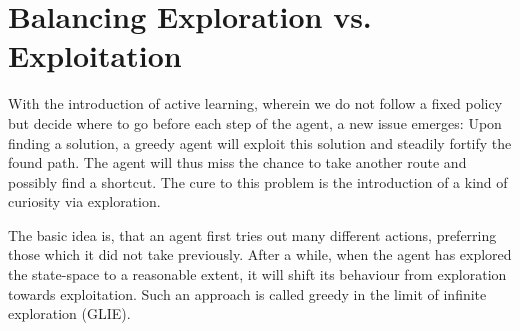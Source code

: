 \documentclass{llncs}
\begin{document}

\section{Balancing Exploration vs. Exploitation}
\label{chap:Balancing}
With the introduction of active learning, wherein we do not follow a fixed policy but decide where to go before each step of the agent, a new issue emerges: Upon finding a solution, a greedy agent will exploit this solution and steadily fortify the found path. The agent will thus miss the chance to take another route and possibly find a shortcut. The cure to this problem is the introduction of a kind of curiosity via exploration.\par

The basic idea is, that an agent first tries out many different actions, preferring those which it did not take previously. After a while, when the agent has explored the state-space to a reasonable extent, it will shift its behaviour from exploration towards exploitation. Such an approach is called greedy in the limit of infinite exploration (GLIE).\par
\end{document}
